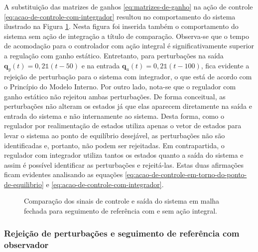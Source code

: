 A substituição das matrizes de ganhos \ref{eq:matrizes-de-ganho} na ação de
controle \ref{eq:acao-de-controle-com-integrador} resultou no comportamento do
sistema ilustrado na Figura \ref{fig:resultado-do-regulador-com-integrador}.
Nesta figura foi inserida também o comportamento do sistema sem ação de
integração a título de comparação. Observa-se que o tempo de acomodação para o
controlador com ação integral é significativamente superior a regulação com
ganho estático. Entretanto, para perturbações na saída $\mathbf{q}_{y}(t) =
0,2\mathbf{\mathds{1}}(t-50)$ e na entrada $\mathbf{q}_{u}(t) =
0,2\mathbf{\mathds{1}}(t-100)$, fica evidente a rejeição de perturbação para o
sistema com integrador, o que está de acordo com o Princípio do Modelo Interno.
Por outro lado, nota-se que o regulador com ganho estático não rejeitou ambas
perturbações. De forma conceitual, as perturbações não alteram os estados já que
elas aparecem diretamente na saída e entrada do sistema e não internamente ao
sistema. Desta forma, como o regulador por realimentação de estados utiliza
apenas o vetor de estados para levar o sistema ao ponto de equilíbrio desejável,
as perturbações não são identificadas e, portanto, não podem ser rejeitadas. Em
contrapartida, o regulador com integrador utiliza tantos os estados quanto a
saída do sistema e assim é possível identificar as perturbações e rejeitá-las.
Estas duas afirmações ficam evidentes analisando as equações
\ref{eq:acao-de-controle-em-torno-do-ponto-de-equilibrio} e
\ref{eq:acao-de-controle-com-integrador}.

\begin{figure}[!htp]
    \caption{Comparação dos sinais de controle e saída do sistema em malha
    fechada para seguimento de referência com e sem ação integral.}
    \vspace{-10pt}
    \hspace{-30pt}
    \label{fig:resultado-do-regulador-com-integrador}
    \begin{minipage}{\linewidth}
        
    \end{minipage}
\end{figure}

\subsubsection{Rejeição de perturbações e seguimento de referência com observador}
\label{subsub:controlador-utilizando-observador-de-estados}

